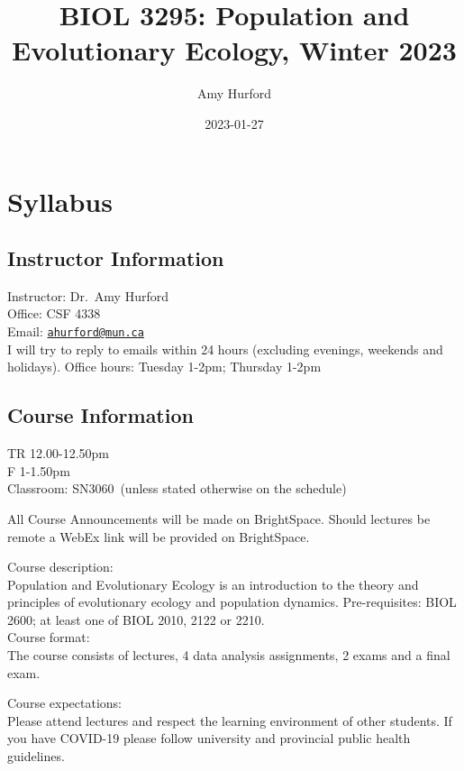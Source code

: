 \documentclass[
]{book}
\title{BIOL 3295: Population and Evolutionary Ecology, Winter 2023}
\author{Amy Hurford}
\date{2023-01-27}
\begin{document}
\maketitle

{
\setcounter{tocdepth}{1}
\tableofcontents
}
\hypertarget{syllabus}{%
\chapter{Syllabus}\label{syllabus}}

\hypertarget{instructor-information}{%
\section{Instructor Information}\label{instructor-information}}

Instructor: Dr.~Amy Hurford\\
Office: CSF 4338\\
Email: \href{mailto:ahurford@mun.ca}{\nolinkurl{ahurford@mun.ca}}\\
I will try to reply to emails within 24 hours (excluding evenings, weekends and holidays).
Office hours: Tuesday 1-2pm; Thursday 1-2pm

\hypertarget{course-information}{%
\section{Course Information}\label{course-information}}

TR 12.00-12.50pm\\
F 1-1.50pm\\
Classroom: SN3060~(unless stated otherwise on the schedule)

All Course Announcements will be made on BrightSpace. Should lectures be remote a WebEx link will be provided on BrightSpace.

Course description:\\
Population and Evolutionary Ecology is an introduction to the theory and principles of evolutionary ecology and population dynamics. Pre-requisites: BIOL 2600; at least one of BIOL 2010, 2122 or 2210.\\

Course format:\\
The course consists of lectures, 4 data analysis assignments, 2 exams and a final exam.~

Course expectations:\\
Please attend lectures and respect the learning environment of other students. If you have COVID-19 please follow university and provincial public health guidelines.\\
\end{document}

